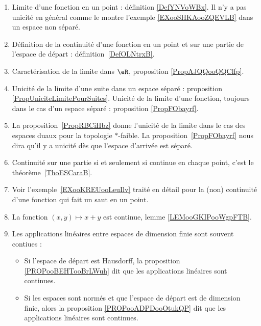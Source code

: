     \label{THEMEooGVCCooHBrNNd}
\begin{enumerate}
	\item
	      Limite d'une fonction en un point : définition \ref{DefYNVoWBx}. Il n'y a pas unicité en général comme le montre l'exemple \ref{EXooSHKAooZQEVLB} dans un espace non séparé.
	\item
	      Définition de la continuité d'une fonction en un point et sur une partie de l'espace de départ : définition~\ref{DefOLNtrxB}.
	\item
	      Caractérisation de la limite dans \( \eR\), proposition \ref{PropAJQQooQQClfp}.
	\item
	      Unicité de la limite d'une suite dans un espace séparé : proposition \ref{PropUniciteLimitePourSuites}. Unicité de la limite d'une fonction, toujours dans le cas d'un espace séparé : proposition \ref{PropFObayrf}.
	\item
	      La proposition~\ref{PropRBCiHbz} donne l'unicité de la limite dans le cas des espaces duaux pour la topologie \( *\)-faible. La proposition~\ref{PropFObayrf} nous dira qu'il y a unicité dès que l'espace d'arrivée est séparé.
	\item
	      Continuité sur une partie si et seulement si continue en chaque point, c'est le théorème~\ref{ThoESCaraB}.
	\item
	      Voir l'exemple~\ref{EXooKREUooLeuIlv} traité en détail pour la (non) continuité d'une fonction qui fait un saut en un point.
	\item
	      La fonction \( (x,y)\mapsto x+y\) est continue, lemme \ref{LEMooGKIPooWgpFTB}.
	\item
	      Les applications linéaires entre espaces de dimension finie sont souvent contiues :
	      \begin{itemize}
		      \item
		            Si l'espace de départ est Hausdorff, la proposition \ref{PROPooBEHTooBrLWuh} dit que les applications linéaires sont continues.
		      \item
		            Si les espaces sont normés et que l'espace de départ est de dimension finie, alors la proposition \ref{PROPooADPDooOtukQP} dit que les applications linéaires sont continues.
	      \end{itemize}
\end{enumerate}
